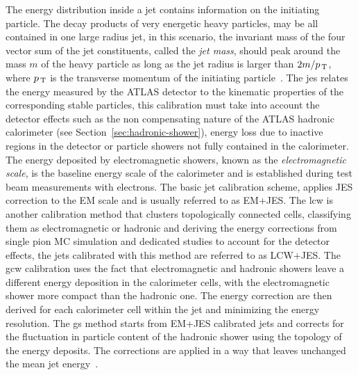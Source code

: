 The energy distribution inside a jet contains information on the initiating
particle. The decay products of very energetic heavy particles, may be all
contained in one large radius jet, in this scenario, the invariant mass of the
four vector sum of the jet constituents, called the \emph{jet mass}, should peak
around the mass $m$ of the heavy particle as long as the jet radius is larger
than $2m / p_\mathrm{\, T}$, where $p_\mathrm{\, T}$ is the transverse momentum of the initiating
particle~\cite{JetMass}. The \gls{jes} relates the energy measured by the ATLAS
detector to the kinematic properties of the corresponding stable particles, this
calibration must take into account the detector effects such as the non
compensating nature of the ATLAS hadronic calorimeter (see
Section~\ref{sec:hadronic-shower}), energy loss due to inactive regions in the
detector or particle showers not fully contained in the calorimeter. The energy
deposited by electromagnetic showers, known as the \emph{electromagnetic scale},
is the baseline energy scale of the calorimeter and is established during test
beam measurements with electrons. The basic jet calibration scheme, applies JES
correction to the EM scale and is usually referred to as EM+JES. The \gls{lcw}
is another calibration method that clusters topologically connected cells,
classifying them as electromagnetic or hadronic and deriving the energy
corrections from single pion MC simulation and dedicated studies to account for
the detector effects, the jets calibrated with this method are referred to as
LCW+JES\@. The \gls{gcw} calibration uses the fact that electromagnetic and
hadronic showers leave a different energy deposition in the calorimeter cells,
with the electromagnetic shower more compact than the hadronic one. The energy
correction are then derived for each calorimeter cell within the jet and
minimizing the energy resolution. The \gls{gs} method starts from EM+JES
calibrated jets and corrects for the fluctuation in particle content of the
hadronic shower using the topology of the energy deposits. The corrections are
applied in a way that leaves unchanged the mean jet energy~\cite{JetCalib}.

